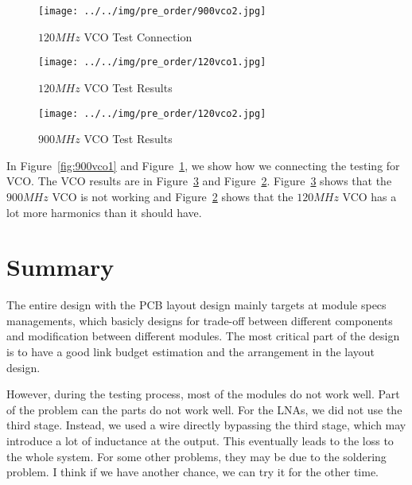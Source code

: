 \documentclass[]{article}
\begin{document}
    \begin{figure}[b!]
        \begin{center}
            \vspace{-0in}
            \texttt{[image: ../../img/pre\_order/900vco2.jpg]}
            \caption{$120MHz$ VCO Test Connection}
            \label{fig:120vco1}
        \end{center}
    \end{figure}

    \begin{figure}[t!]
        \begin{center}
            \vspace{-0.3in}
            \texttt{[image: ../../img/pre\_order/120vco1.jpg]}
            \caption{$120MHz$ VCO Test Results}
            \label{fig:120vco2}
        \end{center}
    \end{figure}

    \begin{figure}[b!]
        \begin{center}
            \vspace{-0in}
            \texttt{[image: ../../img/pre\_order/120vco2.jpg]}
            \caption{$900MHz$ VCO Test Results}
            \label{fig:900vco2}
        \end{center}
    \end{figure}

    In Figure~\ref{fig:900vco1} and Figure~\ref{fig:120vco1}, we show how we
    connecting the testing for VCO. The VCO results are in
    Figure~\ref{fig:900vco2} and Figure~\ref{fig:120vco2}.
    Figure~\ref{fig:900vco2} shows that the $900MHz$ VCO is not working and
    Figure~\ref{fig:120vco2} shows that the $120MHz$ VCO has a lot more
    harmonics than it should have.

\section{Summary}
    The entire design with the PCB layout design mainly targets at module specs
    managements, which basicly designs for trade-off between different
    components and modification between different modules. The most critical
    part of the design is to have a good link budget estimation and the
    arrangement in the layout design. 

    However, during the testing process, most of the modules do not work well.
    Part of the problem can the parts do not work well. For the LNAs, we did not
    use the third stage. Instead, we used a wire directly bypassing the third
    stage, which may introduce a lot of inductance at the output. This
    eventually leads to the loss to the whole system. For some other problems,
    they may be due to the soldering problem. I think if we have another chance,
    we can try it for the other time.
\end{document}
